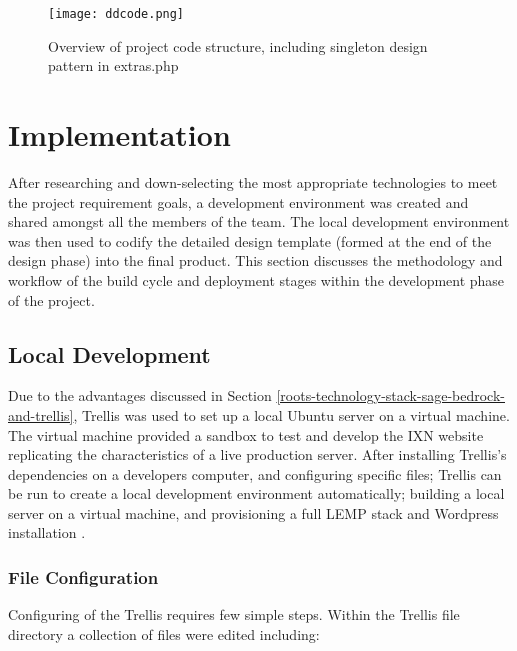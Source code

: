 \documentclass[fontsize=11pt]{extarticle}
\numberwithin{figure}{section} %
\numberwithin{table}{section}%
\begin{document}
\begin{figure}[H]
\centering
\texttt{[image: ddcode.png]}
\caption{Overview of project code structure, including singleton design pattern in extras.php}
\label{ddcode}
\end{figure}

\newpage

\hypertarget{implementation}{%
\section{Implementation}\label{implementation}}

After researching and down-selecting the most appropriate technologies
to meet the project requirement goals, a development environment was
created and shared amongst all the members of the team. The local
development environment was then used to codify the detailed design
template (formed at the end of the design phase) into the final product.
This section discusses the methodology and workflow of the build cycle
and deployment stages within the development phase of the project.

\hypertarget{local-development}{%
\subsection{Local Development}\label{local-development}}

Due to the advantages discussed in Section
\ref{roots-technology-stack-sage-bedrock-and-trellis}, Trellis was used
to set up a local Ubuntu server on a virtual machine. The virtual
machine provided a sandbox to test and develop the IXN website
replicating the characteristics of a live production server. After
installing Trellis's dependencies on a developers computer, and
configuring specific files; Trellis can be run to create a local
development environment automatically; building a local server on a
virtual machine, and provisioning a full LEMP stack and Wordpress
installation \cite{p21}.

\hypertarget{file-configuration}{%
\subsubsection{File Configuration}\label{file-configuration}}

Configuring of the Trellis requires few simple steps. Within the Trellis
file directory a collection of files were edited including:
\end{document}
